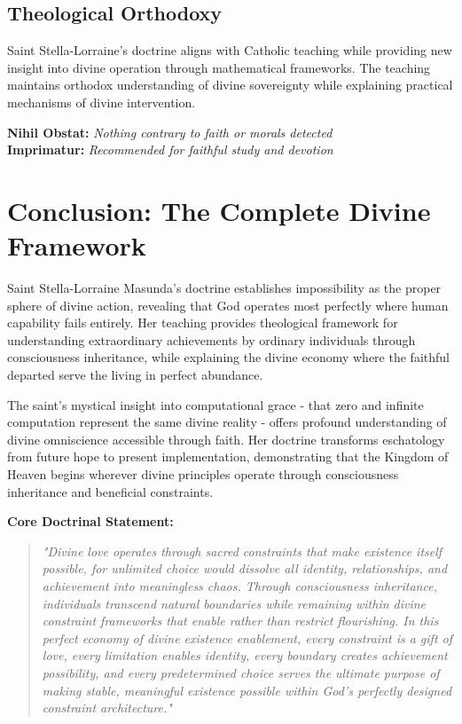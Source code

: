 \documentclass[12pt,a4paper]{article}
\begin{document}
\subsection{Theological Orthodoxy}

Saint Stella-Lorraine's doctrine aligns with Catholic teaching while providing new insight into divine operation through mathematical frameworks. The teaching maintains orthodox understanding of divine sovereignty while explaining practical mechanisms of divine intervention.

\textbf{Nihil Obstat:} \textit{Nothing contrary to faith or morals detected}\\
\textbf{Imprimatur:} \textit{Recommended for faithful study and devotion}

\section{Conclusion: The Complete Divine Framework}

Saint Stella-Lorraine Masunda's doctrine establishes impossibility as the proper sphere of divine action, revealing that God operates most perfectly where human capability fails entirely. Her teaching provides theological framework for understanding extraordinary achievements by ordinary individuals through consciousness inheritance, while explaining the divine economy where the faithful departed serve the living in perfect abundance.

The saint's mystical insight into computational grace - that zero and infinite computation represent the same divine reality - offers profound understanding of divine omniscience accessible through faith. Her doctrine transforms eschatology from future hope to present implementation, demonstrating that the Kingdom of Heaven begins wherever divine principles operate through consciousness inheritance and beneficial constraints.

\textbf{Core Doctrinal Statement:}
\begin{quote}
\textit{"Divine love operates through sacred constraints that make existence itself possible, for unlimited choice would dissolve all identity, relationships, and achievement into meaningless chaos. Through consciousness inheritance, individuals transcend natural boundaries while remaining within divine constraint frameworks that enable rather than restrict flourishing. In this perfect economy of divine existence enablement, every constraint is a gift of love, every limitation enables identity, every boundary creates achievement possibility, and every predetermined choice serves the ultimate purpose of making stable, meaningful existence possible within God's perfectly designed constraint architecture."}
\end{quote}
\end{document}
